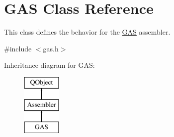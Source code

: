 \hypertarget{class_g_a_s}{}\section{G\+A\+S Class Reference}
\label{class_g_a_s}


This class defines the behavior for the \hyperlink{class_g_a_s}{G\+A\+S} assembler.  




{\ttfamily \#include $<$gas.\+h$>$}

Inheritance diagram for G\+A\+S\+:\begin{figure}[H]
\begin{center}
\leavevmode
\includegraphics[height=3.000000cm]{class_g_a_s}
\end{center}
\end{figure}
